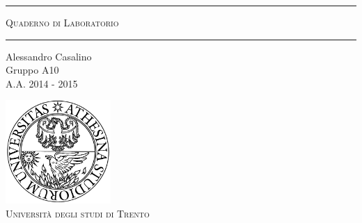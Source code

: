 \begin{titlepage}
\begin{center}

	\hrule \vspace{0.5cm}
     	\textsc{\LARGE Quaderno di Laboratorio}
	\vspace{0.5cm} \hrule \vspace{2cm}

      	{\large Alessandro Casalino\\
		Gruppo A10}\\
	\vspace{0.5cm}
      	{\large A.A. 2014 - 2015}
	\vfill

	\includegraphics[width=4cm]{unitn_logo.png}\\
	\vspace{1cm}
        \textsc{\Large Università degli studi di Trento}
	\vfill


\end{center}
\end{titlepage}